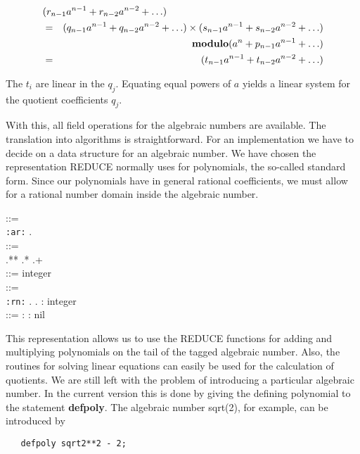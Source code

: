\begin{eqnarray*}
\lefteqn{({r_{n-1}} {a^{n-1}} + {r_{n-2}} {a^{n-2}} + \ldots)} \\
& = & ({q_{n-1}} {a^{n-1}} + {q_{n-2}} {a^{n-2}} + \ldots) \times
({s_{n-1}} {a^{n-1}} + {s_{n-2}} {a^{n-2}} + \ldots) \\
& & {\bf modulo} (a^n + {p _{n-1}} {a^{n -1}} + \ldots) \\
& = & ({t_{n-1}} {a^{n-1}} + {t_{n-2}} {a^{n-2}} + \ldots)
\end{eqnarray*}

The $t_i$ are linear in the $q_j$.  Equating equal powers of $a$ yields a
linear system for the quotient coefficients $q_j$.

With this, all field operations for the algebraic numbers are available.  The
translation into algorithms is straightforward.  For an implementation we
have to decide on a data structure for an algebraic number.  We have chosen
the representation REDUCE normally uses for polynomials, the so-called
standard form.  Since our polynomials have in general rational coefficients,
we must allow for a rational number domain inside the algebraic number.

\begin{tabbing}
 ::= \\
\hspace{.25in} \= {\tt :ar:} . 
\\[0.05in]

 ::= \\
\>  .**  .*  .+  \\[0.05in]

 ::= integer \\[0.3in]

 ::= \\
\> {\tt :rn:} .  .  :
integer \\[0.05in]

 ::=  :  : nil
\end{tabbing}

This representation allows us to use the REDUCE functions for adding and
multiplying polynomials on the tail of the tagged algebraic number.  Also,
the routines for solving linear equations can easily be used for the
calculation of quotients.  We are still left with the problem of
introducing a particular algebraic number.  In the current version this is
done by giving the defining polynomial to the statement {\bf defpoly}.  The
algebraic number sqrt(2), for example, can be introduced by
\begin{verbatim}
   defpoly sqrt2**2 - 2;
\end{verbatim}

